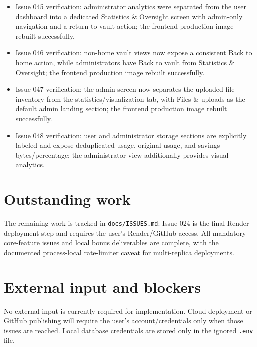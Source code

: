 \documentclass[11pt,a4paper]{article}
\begin{document}
\begin{itemize}[leftmargin=*]
  \item Issue 045 verification: administrator analytics were separated from the user dashboard into a dedicated Statistics \& Oversight screen with admin-only navigation and a return-to-vault action; the frontend production image rebuilt successfully.
  \item Issue 046 verification: non-home vault views now expose a consistent Back to home action, while administrators have Back to vault from Statistics \& Oversight; the frontend production image rebuilt successfully.
  \item Issue 047 verification: the admin screen now separates the uploaded-file inventory from the statistics/visualization tab, with Files \& uploads as the default admin landing section; the frontend production image rebuilt successfully.
  \item Issue 048 verification: user and administrator storage sections are explicitly labeled and expose deduplicated usage, original usage, and savings bytes/percentage; the administrator view additionally provides visual analytics.
\end{itemize}

\section{Outstanding work}
The remaining work is tracked in \texttt{docs/ISSUES.md}: Issue 024 is the final Render deployment step and requires the user's Render/GitHub access. All mandatory core-feature issues and local bonus deliverables are complete, with the documented process-local rate-limiter caveat for multi-replica deployments.

\section{External input and blockers}
No external input is currently required for implementation. Cloud deployment or GitHub publishing will require the user's account/credentials only when those issues are reached. Local database credentials are stored only in the ignored \texttt{.env} file.
\end{document}
